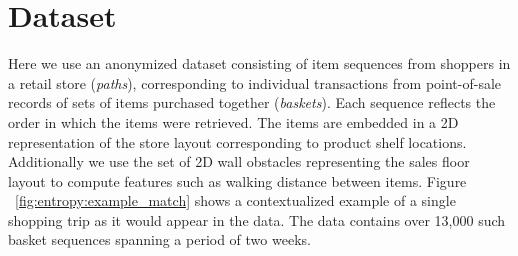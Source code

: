 \documentclass[aps,pre,twocolumn,groupedaddress]{revtex4-2}
\begin{document}

\section{Dataset\label{sec:data}}

Here we use an anonymized dataset consisting of item sequences from shoppers in a retail store (\textit{paths}), corresponding to individual transactions from point-of-sale records of sets of items purchased together (\textit{baskets}). Each sequence reflects the order in which the items were retrieved. The items are embedded in a 2D representation of the store layout corresponding to product shelf locations. Additionally we use the set of 2D wall obstacles representing the sales floor layout to compute features such as walking distance between items. Figure ~\ref{fig:entropy:example_match} shows a contextualized example of a single shopping trip as it would appear in the data. The data contains over 13,000 such basket sequences spanning a period of two weeks.
\end{document}
